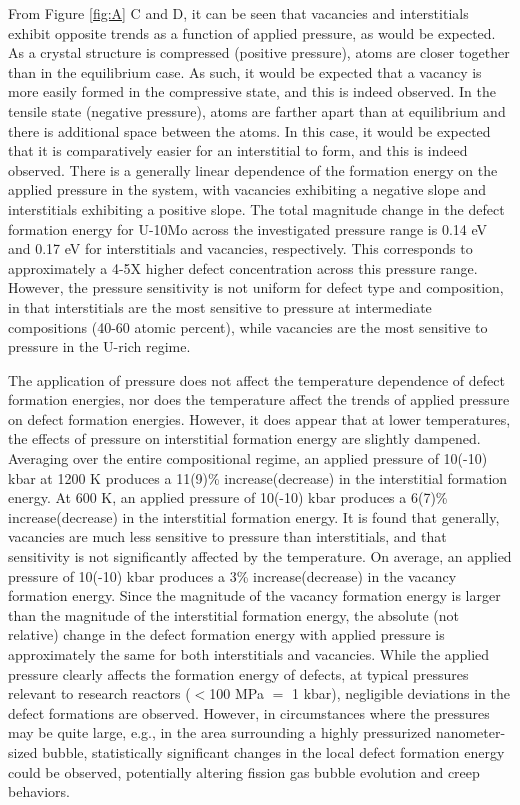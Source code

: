 \documentclass[default]{sn-jnl}%
\begin{document}
From Figure \ref{fig:A} C and D, it can be seen that vacancies and interstitials exhibit opposite trends as a function of applied pressure, as would be expected. As a crystal structure is compressed (positive pressure), atoms are closer together than in the equilibrium case. As such, it would be expected that a vacancy is more easily formed in the compressive state, and this is indeed observed. In the tensile state (negative pressure), atoms are farther apart than at equilibrium and there is additional space between the atoms. In this case, it would be expected that it is comparatively easier for an interstitial to form, and this is indeed observed. There is a generally linear dependence of the formation energy on the applied pressure in the system, with vacancies exhibiting a negative slope and interstitials exhibiting a positive slope. The total magnitude change in the defect formation energy for U-10Mo across the investigated pressure range is 0.14 eV and 0.17 eV for interstitials and vacancies, respectively. This corresponds to approximately a 4-5X higher defect concentration across this pressure range. However, the pressure sensitivity is not uniform for defect type and composition, in that interstitials are the most sensitive to pressure at intermediate compositions (40-60 atomic percent), while vacancies are the most sensitive to pressure in the U-rich regime. 

The application of pressure does not affect the temperature dependence of defect formation energies, nor does the temperature affect the trends of applied pressure on defect formation energies. However, it does appear that at lower temperatures, the effects of pressure on interstitial formation energy are slightly dampened. Averaging over the entire compositional regime, an applied pressure of 10(-10) kbar at 1200 K produces a 11(9)\% increase(decrease) in the interstitial formation energy. At 600 K, an applied pressure of 10(-10) kbar produces a 6(7)\% increase(decrease) in the interstitial formation energy. It is found that generally, vacancies are much less sensitive to pressure than interstitials, and that sensitivity is not significantly affected by the temperature. On average, an applied pressure of 10(-10) kbar produces a 3\% increase(decrease) in the vacancy formation energy. Since the magnitude of the vacancy formation energy is larger than the magnitude of the interstitial formation energy, the absolute (not relative) change in the defect formation energy with applied pressure is approximately the same for both interstitials and vacancies. While the applied pressure clearly affects the formation energy of defects, at typical pressures relevant to research reactors ($<$100 MPa $=$ 1 kbar), negligible deviations in the defect formations are observed. However, in circumstances where the pressures may be quite large, e.g., in the area surrounding a highly pressurized nanometer-sized bubble, statistically significant changes in the local defect formation energy could be observed, potentially altering fission gas bubble evolution and creep behaviors.
\end{document}
